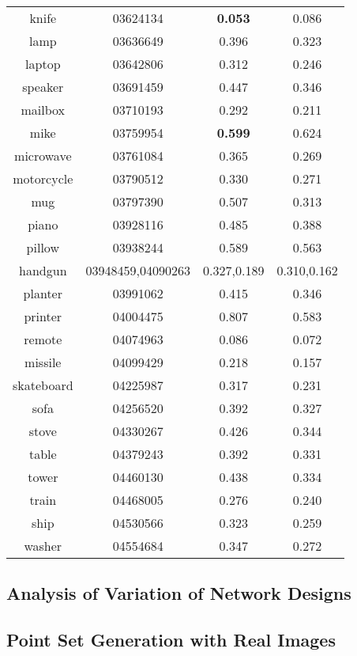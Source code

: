 \begin{table*}
\begin{tabular}{c c c c}
		knife & 03624134 & {\color{green} \textbf{0.053}}  & 0.086\\
		lamp & 03636649 & 0.396 & 0.323\\
		laptop & 03642806 & 0.312 & 0.246\\
		speaker & 03691459 & 0.447 & 0.346\\
		mailbox & 03710193 & 0.292 & 0.211\\
		mike & 03759954 & {\color{green} \textbf{0.599}} & 0.624\\
		microwave & 03761084 & 0.365 & 0.269\\
		motorcycle & 03790512 & 0.330 & 0.271\\
		mug & 03797390 & 0.507 & 0.313\\
		piano & 03928116 & 0.485 & 0.388\\
		pillow & 03938244 & 0.589 & 0.563\\
		handgun & 03948459,04090263 & 0.327,0.189 & 0.310,0.162\\
		planter & 03991062 & 0.415 & 0.346\\
		printer & 04004475 & 0.807 & 0.583\\
		remote & 04074963 & 0.086 & 0.072\\
		missile & 04099429 & 0.218 & 0.157\\
		skateboard & 04225987 & 0.317 & 0.231\\
		sofa & 04256520 & 0.392 & 0.327\\
		stove & 04330267 & 0.426 & 0.344\\
		table & 04379243 & 0.392 & 0.331\\
		tower & 04460130 & 0.438 & 0.334\\
		train & 04468005 & 0.276 & 0.240\\
		ship  & 04530566 & 0.323 & 0.259\\
		washer &  04554684 & 0.347 & 0.272\\
	\end{tabular}
	\label{tab:seg}
\end{table*}

\subsection{Analysis of Variation of Network Designs}
\subsection{Point Set Generation with Real Images}
